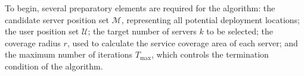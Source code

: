 \documentclass[10pt, conference, letterpaper]{IEEEtran}
\begin{document}
To begin, several preparatory elements are required for the algorithm: the candidate server position set
  $\mathcal{M}$, representing all potential deployment locations; the user position set $\mathcal{U}$; the target number
   of servers $k$ to be selected; the coverage radius $r$, used to calculate the service coverage area of each server;
  and the maximum number of iterations $T_{\max}$, which controls the termination condition of the algorithm.
\end{document}

